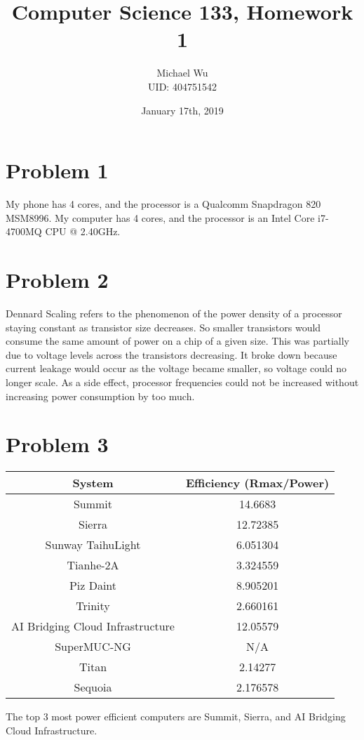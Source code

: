 \documentclass[12pt]{article}
\begin{document}
\title{Computer Science 133, Homework 1}
\date{January 17th, 2019}
\author{Michael Wu\\UID: 404751542}
\maketitle

\section*{Problem 1}

My phone has 4 cores, and the processor is a Qualcomm Snapdragon 820 MSM8996. My computer has 4 cores, and
the processor is an Intel Core i7-4700MQ CPU @ 2.40GHz.

\section*{Problem 2}

Dennard Scaling refers to the phenomenon of the power density of a processor staying constant as transistor
size decreases. So smaller transistors would consume the same amount of power on a chip of a given size.
This was partially due to voltage levels across the transistors decreasing. It broke down because current
leakage would occur as the voltage became smaller, so voltage could no longer scale. As a side effect,
processor frequencies could not be increased without increasing power consumption by too much.

\section*{Problem 3}

\begin{center}
    \begin{tabular}{c|c}
        System & Efficiency (Rmax/Power)\\
        \hline
        Summit & 14.6683\\
        Sierra & 12.72385\\
        Sunway TaihuLight & 6.051304\\
        Tianhe-2A & 3.324559\\
        Piz Daint & 8.905201\\
        Trinity & 2.660161\\
        AI Bridging Cloud Infrastructure & 12.05579\\
        SuperMUC-NG & N/A\\
        Titan & 2.14277\\
        Sequoia & 2.176578
    \end{tabular}
\end{center}
The top 3 most power efficient computers are Summit, Sierra, and AI Bridging Cloud Infrastructure.
\end{document}
